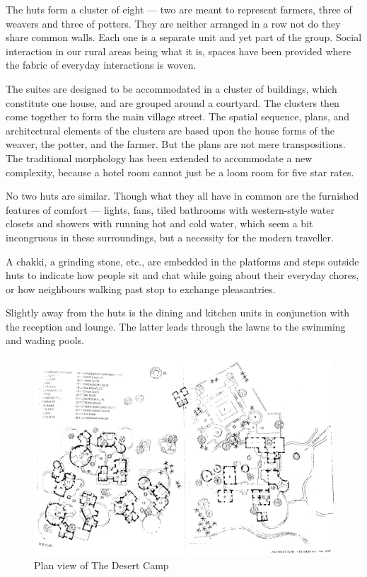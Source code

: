 The huts form a cluster of eight --- two are meant to represent farmers, three of weavers and three of potters. They are neither arranged in a row not do they share common walls. Each one is a separate unit and yet part of the group. Social interaction in our rural areas being what it is, spaces have been provided where the fabric of everyday interactions is woven.

The suites are designed to be accommodated in a cluster of buildings, which constitute one house, and are grouped around a courtyard. The clusters then come together to form the main village street. The spatial sequence, plans, and architectural elements of the clusters are based upon the house forms of the weaver, the potter, and the farmer. But the plans are not mere transpositions. The traditional morphology has been extended to accommodate a new complexity, because a hotel room cannot just be a loom room for five star rates.

No two huts are similar. Though what they all have in common are the furnished features of comfort --- lights, fans, tiled bathrooms with western-style water closets and showers with running hot and cold water, which seem a bit incongruous in these surroundings, but a necessity for the modern traveller.

A chakki, a grinding stone, etc., are embedded in the platforms and steps outside huts to indicate how people sit and chat while going about their everyday chores, or how neighbours walking past stop to exchange pleasantries.

Slightly away from the huts is the dining and kitchen units in conjunction with the reception and lounge. The latter leads through the lawns to the swimming and wading pools.

\begin{figure}[H]
  \centering
  \includegraphics[angle=90,width=1.0\textwidth]{img/dc-02}
  \caption{Plan view of The Desert Camp}
  \label{fig:dc-02} 
\end{figure}

